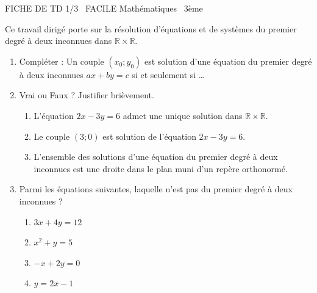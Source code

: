 \documentclass[11pt]{article}
\begin{document}
\begin{tcolorbox}[enhanced,colback=popink,colframe=popink,arc=10pt,boxrule=0pt,left=12pt,right=12pt,top=9pt,bottom=9pt]
{\color{white}\popxbold\small FICHE DE TD 1/3 \textbullet\ FACILE \hfill Mathématiques \textbullet\ 3ème\par}
\end{tcolorbox}
\vspace{4pt}
Ce travail dirigé porte sur la résolution d'équations et de systèmes du premier degré à deux inconnues dans $\mathbb{R} \times \mathbb{R}$.

\begin{exercice}
\begin{enumerate}
    \item Compléter : Un couple $(x_0 ; y_0)$ est solution d'une équation du premier degré à deux inconnues $ax+by=c$ si et seulement si \ldots
    \item Vrai ou Faux ? Justifier brièvement.
    \begin{enumerate}
        \item L'équation $2x - 3y = 6$ admet une unique solution dans $\mathbb{R} \times \mathbb{R}$.
        \item Le couple $(3 ; 0)$ est solution de l'équation $2x - 3y = 6$.
        \item L'ensemble des solutions d'une équation du premier degré à deux inconnues est une droite dans le plan muni d'un repère orthonormé.
    \end{enumerate}
    \item Parmi les équations suivantes, laquelle n'est pas du premier degré à deux inconnues ?
    \begin{enumerate}
        \item $3x + 4y = 12$
        \item $x^2 + y = 5$
        \item $-x + 2y = 0$
        \item $y = 2x - 1$
    \end{enumerate}
\end{enumerate}
\end{exercice}
\end{document}
